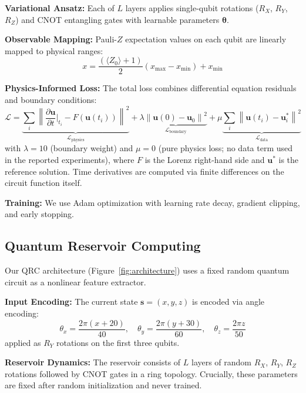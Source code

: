 \documentclass[11pt,a4paper]{article}
\begin{document}
\textbf{Variational Ansatz:} Each of $L$ layers applies single-qubit rotations ($R_X$, $R_Y$, $R_Z$) and CNOT entangling gates with learnable parameters $\boldsymbol{\theta}$.

\textbf{Observable Mapping:} Pauli-$Z$ expectation values on each qubit are linearly mapped to physical ranges:
\begin{equation}
    x = \frac{(\langle Z_0 \rangle + 1)}{2}(x_{\max} - x_{\min}) + x_{\min}
\end{equation}

\textbf{Physics-Informed Loss:} The total loss combines differential equation residuals and boundary conditions:
\begin{equation}
    \mathcal{L} = \underbrace{\sum_{i} \left\| \frac{\partial \mathbf{u}}{\partial t}\bigg|_{t_i} - F(\mathbf{u}(t_i)) \right\|^2}_{\mathcal{L}_{\text{physics}}} + \lambda \underbrace{\left\| \mathbf{u}(0) - \mathbf{u}_0 \right\|^2}_{\mathcal{L}_{\text{boundary}}} + \mu \underbrace{\sum_i \left\| \mathbf{u}(t_i) - \mathbf{u}^*_i \right\|^2}_{\mathcal{L}_{\text{data}}}
\end{equation}
with $\lambda = 10$ (boundary weight) and $\mu = 0$ (pure physics loss; no data term used in the reported experiments), where $F$ is the Lorenz right-hand side and $\mathbf{u}^*$ is the reference solution. Time derivatives are computed via finite differences on the circuit function itself.

\textbf{Training:} We use Adam optimization with learning rate decay, gradient clipping, and early stopping.

\subsection{Quantum Reservoir Computing}

Our QRC architecture (Figure~\ref{fig:architecture}) uses a fixed random quantum circuit as a nonlinear feature extractor.

\textbf{Input Encoding:} The current state $\mathbf{s} = (x, y, z)$ is encoded via angle encoding:
\begin{equation}
    \theta_x = \frac{2\pi(x + 20)}{40}, \quad \theta_y = \frac{2\pi(y + 30)}{60}, \quad \theta_z = \frac{2\pi z}{50}
\end{equation}
applied as $R_Y$ rotations on the first three qubits.

\textbf{Reservoir Dynamics:} The reservoir consists of $L$ layers of random $R_X$, $R_Y$, $R_Z$ rotations followed by CNOT gates in a ring topology. Crucially, these parameters are fixed after random initialization and never trained.
\end{document}

